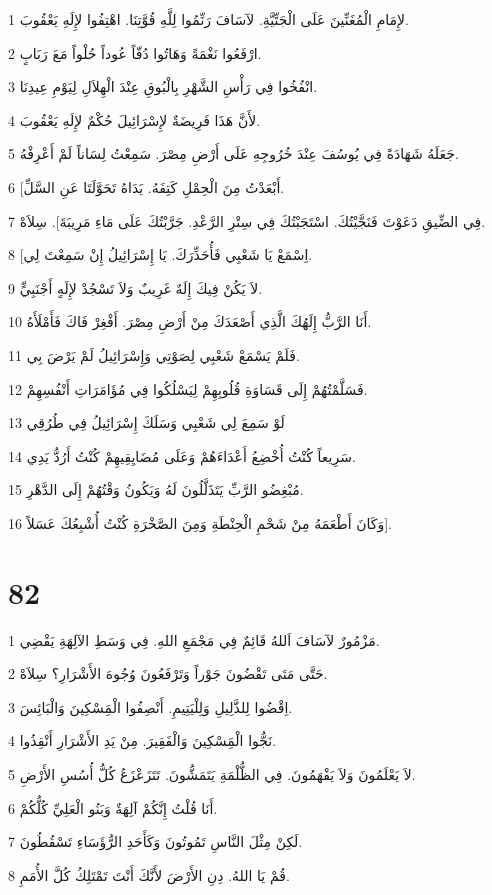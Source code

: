 \par 1 لإِمَامِ الْمُغَنِّينَ عَلَى الْجَتِّيَّةِ. لآسَافَ رَنِّمُوا لِلَّهِ قُوَّتِنَا. اهْتِفُوا لإِلَهِ يَعْقُوبَ.
\par 2 ارْفَعُوا نَغْمَةً وَهَاتُوا دُفّاً عُوداً حُلْواً مَعَ رَبَابٍ.
\par 3 انْفُخُوا فِي رَأْسِ الشَّهْرِ بِالْبُوقِ عِنْدَ الْهِلاَلِ لِيَوْمِ عِيدِنَا.
\par 4 لأَنَّ هَذَا فَرِيضَةٌ لإِسْرَائِيلَ حُكْمٌ لإِلَهِ يَعْقُوبَ.
\par 5 جَعَلَهُ شَهَادَةً فِي يُوسُفَ عِنْدَ خُرُوجِهِ عَلَى أَرْضِ مِصْرَ. سَمِعْتُ لِسَاناً لَمْ أَعْرِفْهُ.
\par 6 [أَبْعَدْتُ مِنَ الْحِمْلِ كَتِفَهُ. يَدَاهُ تَحَوَّلَتَا عَنِ السَّلِّ.
\par 7 فِي الضِّيقِ دَعَوْتَ فَنَجَّيْتُكَ. اسْتَجَبْتُكَ فِي سِتْرِ الرَّعْدِ. جَرَّبْتُكَ عَلَى مَاءِ مَرِيبَةَ]. سِلاَهْ.
\par 8 [اِسْمَعْ يَا شَعْبِي فَأُحَذِّرَكَ. يَا إِسْرَائِيلُ إِنْ سَمِعْتَ لِي.
\par 9 لاَ يَكُنْ فِيكَ إِلَهٌ غَرِيبٌ وَلاَ تَسْجُدْ لإِلَهٍ أَجْنَبِيٍّ.
\par 10 أَنَا الرَّبُّ إِلَهُكَ الَّذِي أَصْعَدَكَ مِنْ أَرْضِ مِصْرَ. أَفْغِرْ فَاكَ فَأَمْلَأَهُ.
\par 11 فَلَمْ يَسْمَعْ شَعْبِي لِصَوْتِي وَإِسْرَائِيلُ لَمْ يَرْضَ بِي.
\par 12 فَسَلَّمْتُهُمْ إِلَى قَسَاوَةِ قُلُوبِهِمْ لِيَسْلُكُوا فِي مُؤَامَرَاتِ أَنْفُسِهِمْ.
\par 13 لَوْ سَمِعَ لِي شَعْبِي وَسَلَكَ إِسْرَائِيلُ فِي طُرُقِي
\par 14 سَرِيعاً كُنْتُ أُخْضِعُ أَعْدَاءَهُمْ وَعَلَى مُضَايِقِيهِمْ كُنْتُ أَرُدُّ يَدِي.
\par 15 مُبْغِضُو الرَّبِّ يَتَذَلَّلُونَ لَهُ وَيَكُونُ وَقْتُهُمْ إِلَى الدَّهْرِ.
\par 16 وَكَانَ أَطْعَمَهُ مِنْ شَحْمِ الْحِنْطَةِ وَمِنَ الصَّخْرَةِ كُنْتُ أُشْبِعُكَ عَسَلاً].

\chapter{82}

\par 1 مَزْمُورٌ لآسَافَ اَللهُ قَائِمٌ فِي مَجْمَعِ اللهِ. فِي وَسَطِ الآلِهَةِ يَقْضِي.
\par 2 حَتَّى مَتَى تَقْضُونَ جَوْراً وَتَرْفَعُونَ وُجُوهَ الأَشْرَارِ؟ سِلاَهْ.
\par 3 اِقْضُوا لِلذَّلِيلِ وَلِلْيَتِيمِ. أَنْصِفُوا الْمَِسْكِينَ وَالْبَائِسَ.
\par 4 نَجُّوا الْمَِسْكِينَ وَالْفَقِيرَ. مِنْ يَدِ الأَشْرَارِ أَنْقِذُوا.
\par 5 لاَ يَعْلَمُونَ وَلاَ يَفْهَمُونَ. فِي الظُّلْمَةِ يَتَمَشُّونَ. تَتَزَعْزَعُ كُلُّ أُسُسِ الأَرْضِ.
\par 6 أَنَا قُلْتُ إِنَّكُمْ آلِهَةٌ وَبَنُو الْعَلِيِّ كُلُّكُمْ.
\par 7 لَكِنْ مِثْلَ النَّاسِ تَمُوتُونَ وَكَأَحَدِ الرُّؤَسَاءِ تَسْقُطُونَ.
\par 8 قُمْ يَا اللهُ. دِنِ الأَرْضَ لأَنَّكَ أَنْتَ تَمْتَلِكُ كُلَّ الأُمَمِ.

